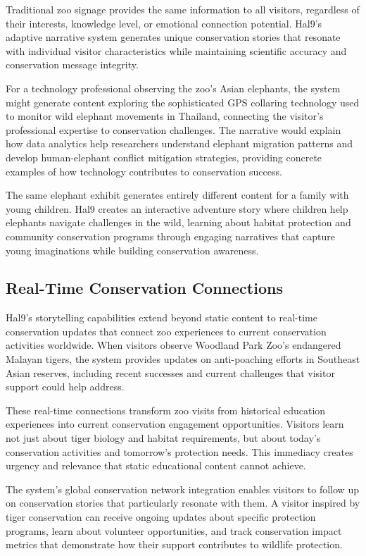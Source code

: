 \documentclass[
  Letterpaper,
]{scrbook}
\begin{document}
Traditional zoo signage provides the same information to all visitors,
regardless of their interests, knowledge level, or emotional connection
potential. Hal9's adaptive narrative system generates unique
conservation stories that resonate with individual visitor
characteristics while maintaining scientific accuracy and conservation
message integrity.

For a technology professional observing the zoo's Asian elephants, the
system might generate content exploring the sophisticated GPS collaring
technology used to monitor wild elephant movements in Thailand,
connecting the visitor's professional expertise to conservation
challenges. The narrative would explain how data analytics help
researchers understand elephant migration patterns and develop
human-elephant conflict mitigation strategies, providing concrete
examples of how technology contributes to conservation success.

The same elephant exhibit generates entirely different content for a
family with young children. Hal9 creates an interactive adventure story
where children help elephants navigate challenges in the wild, learning
about habitat protection and community conservation programs through
engaging narratives that capture young imaginations while building
conservation awareness.

\subsection{Real-Time Conservation
Connections}\label{real-time-conservation-connections}

Hal9's storytelling capabilities extend beyond static content to
real-time conservation updates that connect zoo experiences to current
conservation activities worldwide. When visitors observe Woodland Park
Zoo's endangered Malayan tigers, the system provides updates on
anti-poaching efforts in Southeast Asian reserves, including recent
successes and current challenges that visitor support could help
address.

These real-time connections transform zoo visits from historical
education experiences into current conservation engagement
opportunities. Visitors learn not just about tiger biology and habitat
requirements, but about today's conservation activities and tomorrow's
protection needs. This immediacy creates urgency and relevance that
static educational content cannot achieve.

The system's global conservation network integration enables visitors to
follow up on conservation stories that particularly resonate with them.
A visitor inspired by tiger conservation can receive ongoing updates
about specific protection programs, learn about volunteer opportunities,
and track conservation impact metrics that demonstrate how their support
contributes to wildlife protection.
\end{document}
